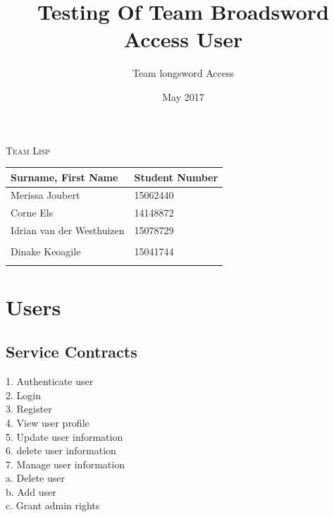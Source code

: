 \documentclass[english]{article}
\begin{document}
\title{Testing Of Team Broadsword Access User }
\author{Team longsword Access }
\date{May 2017}
\maketitle
\begin{center}
{\scshape\Large Team Lisp \par}
\vspace{0.9cm}
	\begin{tabu} to \textwidth { X[l] X[l]}
		\hline
		\textbf{Surname, First Name  }	& \textbf{Student Number}	\\ \hline \hline
		   Merissa Joubert &15062440	\\ \hline
		  Corne Els &14148872	\\ \hline
		Idrian van der Westhuizen&15078729\\ \hline
		 &	\\ \hline
		 Dinake Keoagile&15041744\\ \hline
		 &	\\ \hline
		\hline
	\end{tabu}

	\end{center}

	\newpage
	\tableofcontents

	\newpage

\section{Users}

\subsection{Service Contracts}
1.	Authenticate user\\
2.	Login\\
3.	Register\\
4.	View user profile\\
5.	Update user information\\
6.	delete user information\\
7.	Manage user information\\
    a.	Delete user\\
    b.	Add user\\
    c.	Grant admin rights\\
\end{document}
